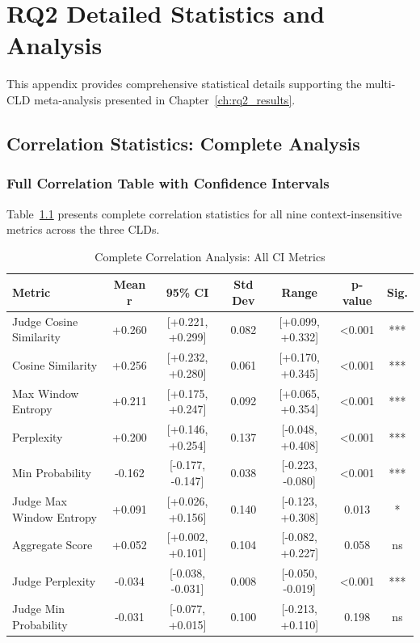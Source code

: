 \chapter{RQ2 Detailed Statistics and Analysis}
\label{app:rq2_detailed}

This appendix provides comprehensive statistical details supporting the multi-CLD meta-analysis presented in Chapter~\ref{ch:rq2_results}.

\section{Correlation Statistics: Complete Analysis}

\subsection{Full Correlation Table with Confidence Intervals}

Table~\ref{tab:rq2_full_correlations} presents complete correlation statistics for all nine context-insensitive metrics across the three CLDs.

\begin{table}[h]
\centering
\small
\caption{Complete Correlation Analysis: All CI Metrics}
\label{tab:rq2_full_correlations}
\begin{tabular}{lcccccc}
\toprule
\textbf{Metric} & \textbf{Mean r} & \textbf{95\% CI} & \textbf{Std Dev} & \textbf{Range} & \textbf{p-value} & \textbf{Sig.} \\
\midrule
Judge Cosine Similarity   & +0.260 & [+0.221, +0.299] & 0.082 & [+0.099, +0.332] & <0.001 & *** \\
Cosine Similarity         & +0.256 & [+0.232, +0.280] & 0.061 & [+0.170, +0.345] & <0.001 & *** \\
Max Window Entropy        & +0.211 & [+0.175, +0.247] & 0.092 & [+0.065, +0.354] & <0.001 & *** \\
Perplexity                & +0.200 & [+0.146, +0.254] & 0.137 & [-0.048, +0.408] & <0.001 & *** \\
Min Probability           & -0.162 & [-0.177, -0.147] & 0.038 & [-0.223, -0.080] & <0.001 & *** \\
Judge Max Window Entropy  & +0.091 & [+0.026, +0.156] & 0.140 & [-0.123, +0.308] & 0.013  & *   \\
Aggregate Score           & +0.052 & [+0.002, +0.101] & 0.104 & [-0.082, +0.227] & 0.058  & ns  \\
Judge Perplexity          & -0.034 & [-0.038, -0.031] & 0.008 & [-0.050, -0.019] & <0.001 & *** \\
Judge Min Probability     & -0.031 & [-0.077, +0.015] & 0.100 & [-0.213, +0.110] & 0.198  & ns  \\
\bottomrule
\end{tabular}
\end{table}

